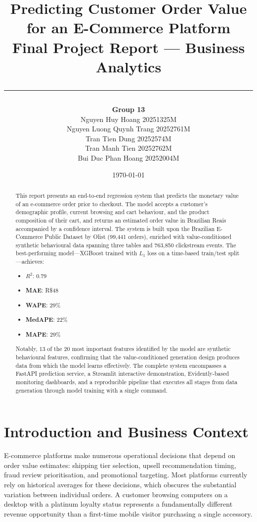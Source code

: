 \documentclass[11pt,a4paper]{article}
\title{
  \vspace{-1cm}
  {\LARGE\bfseries\color{brandcolor} Predicting Customer Order Value\\[6pt]
   for an E-Commerce Platform}\\[12pt]
  {\large\color{accentcolor} Final Project Report --- Business Analytics}\\[20pt]
  \rule{\textwidth}{0.8pt}
}
\author{
  \textbf{Group 13}\\[4pt]
  \small Nguyen Huy Hoang 20251325M\\
  \small Nguyen Luong Quynh Trang 20252761M\\
  \small Tran Tien Dung 20252574M\\
  \small Tran Manh Tien 20252762M\\
  \small Bui Duc Phan Hoang 20252004M
}
\date{\today}
\begin{document}
\maketitle
\thispagestyle{fancy}

\begin{abstract}
\noindent
This report presents an end-to-end regression system that predicts the monetary
value of an e-commerce order prior to checkout.  The model accepts a customer's
demographic profile, current browsing and cart behaviour, and the product
composition of their cart, and returns an estimated order value in Brazilian
Reais accompanied by a confidence interval.  The system is built upon the
Brazilian E-Commerce Public Dataset by Olist (99{,}441 orders), enriched with
value-conditioned synthetic behavioural data spanning three tables and 763{,}850
clickstream events.  The best-performing model---XGBoost trained with
$L_{1}$ loss on a time-based train/test split---achieves:
\begin{itemize}
  \item \textbf{$R^{2}$}: 0.79
  \item \textbf{MAE}: R\$48
  \item \textbf{WAPE}: 29\%
  \item \textbf{MedAPE}: 22\%
  \item \textbf{MAPE}: 29\%
\end{itemize}
Notably, 13 of the 20 most
important features identified by the model are synthetic behavioural features,
confirming that the value-conditioned generation design produces data from which
the model learns effectively.  The complete system encompasses a FastAPI
prediction service, a Streamlit interactive demonstration, Evidently-based
monitoring dashboards, and a reproducible pipeline that executes all stages from
data generation through model training with a single command.
\end{abstract}

\tableofcontents
\newpage

\section{Introduction and Business Context}
\label{sec:intro}

E-commerce platforms make numerous operational decisions that depend on order
value estimates: shipping tier selection, upsell recommendation timing, fraud
review prioritisation, and promotional targeting.  Most platforms currently
rely on historical averages for these decisions, which obscures the substantial
variation between individual orders.  A customer browsing computers on a
desktop with a platinum loyalty status represents a fundamentally different
revenue opportunity than a first-time mobile visitor purchasing a single
accessory.
\end{document}
